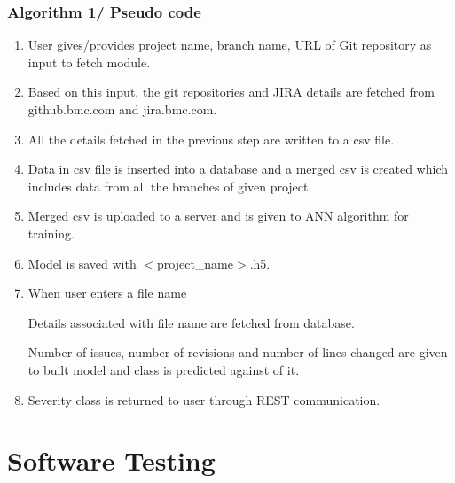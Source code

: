 \documentclass[oneside,a4paper,12pt]{book}
\begin{document}
\subsection{Algorithm 1/ Pseudo code}



\begin{enumerate}
	\item User gives/provides project name, branch name, URL of Git repository as input to fetch module.\par

	\item Based on this input, the git repositories and JIRA details are fetched from github.bmc.com and jira.bmc.com.\par

	\item All the details fetched in the previous step are written to a csv file.\par

	\item Data in csv file is inserted into a database and a merged csv is created which includes data from all the branches of given project.\par

	\item Merged csv is uploaded to a server and is given to ANN algorithm for training.\par

	\item Model is saved with $<$project\_name$>$.h5.\par

	\item When user enters a file name


 Details associated with file name are fetched from database.




 Number of issues, number of revisions and number of lines changed are given to built model and class is predicted against of it.

 \item Severity class is returned to user through REST communication. \par

\end{enumerate}\par


\newpage
\chapter{Software Testing}
\end{document}
